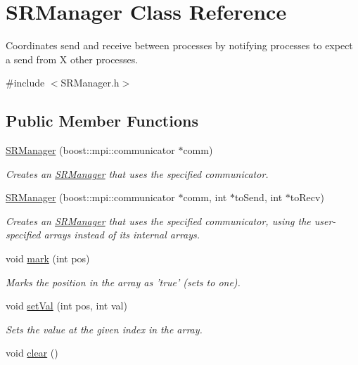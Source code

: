 \hypertarget{class_s_r_manager}{\section{S\-R\-Manager Class Reference}
\label{class_s_r_manager}
}


Coordinates send and receive between processes by notifying processes to expect a send from X other processes.  




{\ttfamily \#include $<$S\-R\-Manager.\-h$>$}

\subsection*{Public Member Functions}
\begin{DoxyCompactItemize}
\item 
\hyperlink{class_s_r_manager_abf18b9ce2db0052dcf5ea23f90332764}{S\-R\-Manager} (boost\-::mpi\-::communicator $\ast$comm)
\begin{DoxyCompactList}\small\item\em Creates an \hyperlink{class_s_r_manager}{S\-R\-Manager} that uses the specified communicator. \end{DoxyCompactList}\item 
\hyperlink{class_s_r_manager_afe1973a5e8bff12ed181e3fb6d668f6b}{S\-R\-Manager} (boost\-::mpi\-::communicator $\ast$comm, int $\ast$to\-Send, int $\ast$to\-Recv)
\begin{DoxyCompactList}\small\item\em Creates an \hyperlink{class_s_r_manager}{S\-R\-Manager} that uses the specified communicator, using the user-\/specified arrays instead of its internal arrays. \end{DoxyCompactList}\item 
void \hyperlink{class_s_r_manager_aa0be1af96adce544ad27ef32288b5525}{mark} (int pos)
\begin{DoxyCompactList}\small\item\em Marks the position in the array as 'true' (sets to one). \end{DoxyCompactList}\item 
void \hyperlink{class_s_r_manager_aa6ad73d180126d0072f82bd160e335e7}{set\-Val} (int pos, int val)
\begin{DoxyCompactList}\small\item\em Sets the value at the given index in the array. \end{DoxyCompactList}\item 
\hypertarget{class_s_r_manager_ae8f0d35fb26ac5ab039d815bfdef01f9}{void \hyperlink{class_s_r_manager_ae8f0d35fb26ac5ab039d815bfdef01f9}{clear} ()}\label{class_s_r_manager_ae8f0d35fb26ac5ab039d815bfdef01f9}


\end{DoxyCompactItemize}
